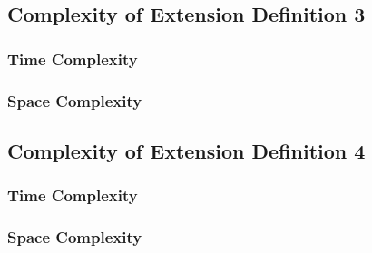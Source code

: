 \documentclass[conference]{IEEEtran}
\begin{document}
\subsection{Complexity of Extension Definition 3}

\subsubsection{Time Complexity}

\subsubsection{Space Complexity}

\subsection{Complexity of Extension Definition 4}

\subsubsection{Time Complexity}

\subsubsection{Space Complexity}


\end{document}
